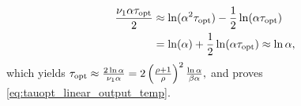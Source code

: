 \documentclass[12pt, draftclsnofoot,journal,onecolumn]{IEEEtran}
\begin{document}
{{\begin{align*}
   \frac{\nu_1\alpha\tau_{{\rm opt}}}{2}&\approx\ln(\alpha^2\tau_{{\rm opt}})-\frac{1}{2}\ln(\alpha\tau_{{\rm opt}})\\
   &=\ln(\alpha)+\frac{1}{2}\ln(\alpha\tau_{{\rm opt}})\approx\ln\alpha,
\end{align*}
}
which yields $\tau_{{\rm opt}}\approx\frac{2\ln\alpha}{\nu_1\alpha}=2\left(\frac{\rho+1}{\rho}\right)^2\frac{\ln\alpha}{\beta\alpha},$
and proves \eqref{eq:tauopt_linear_output_temp}.
}

\end{document}
